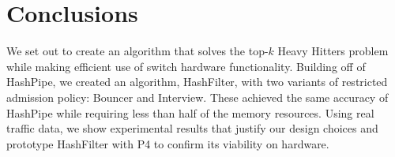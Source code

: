 \section{Conclusions}
\label{sec:conclusion}

We set out to create an algorithm that solves the top-$k$ Heavy Hitters problem while making efficient use of switch hardware functionality. Building off of HashPipe, we created an algorithm, HashFilter, with two variants of restricted admission policy: Bouncer and Interview. These achieved the same accuracy of HashPipe while requiring less than half of the memory resources. Using real traffic data, we show experimental results that justify our design choices and prototype HashFilter with P4 to confirm its viability on hardware.